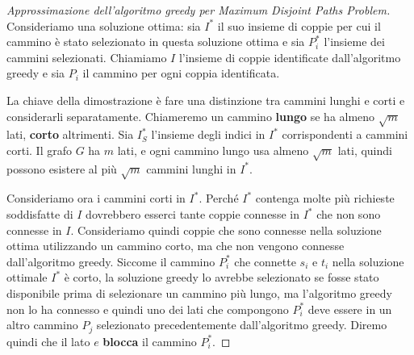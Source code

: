 \documentclass[\main/main.tex]{subfiles}
\begin{document}
\begin{proof}[Approssimazione dell'algoritmo greedy per Maximum Disjoint Paths Problem]
    Consideriamo una soluzione ottima: sia \(I^*\) il suo insieme di coppie per cui il cammino è stato selezionato in questa soluzione ottima e sia \(P_i^*\) l'insieme dei cammini selezionati. Chiamiamo \(I\) l'insieme di coppie identificate dall'algoritmo greedy e sia \(P_i\) il cammino per ogni coppia identificata.
    
    La chiave della dimostrazione è fare una distinzione tra cammini lunghi e corti e considerarli separatamente. Chiameremo un cammino \textbf{lungo} se ha almeno \(\sqrt{m}\) lati, \textbf{corto} altrimenti. Sia \(I_S^*\) l'insieme degli indici in \(I^*\) corrispondenti a cammini corti. Il grafo \(G\) ha \(m\) lati, e ogni cammino lungo usa almeno \(\sqrt{m}\) lati, quindi possono esistere al più \(\sqrt{m}\) cammini lunghi in \(I^*\).
    
    Consideriamo ora i cammini corti in \(I^*\). Perché \(I^*\) contenga molte più richieste soddisfatte di \(I\) dovrebbero esserci tante coppie connesse in \(I^*\) che non sono connesse in \(I\). Consideriamo quindi coppie che sono connesse nella soluzione ottima utilizzando un cammino corto, ma che non vengono connesse dall'algoritmo greedy. Siccome il cammino \(P^*_i\) che connette \(s_i\) e \(t_i\) nella soluzione ottimale \(I^*\) è corto, la soluzione greedy lo avrebbe selezionato se fosse stato disponibile prima di selezionare un cammino più lungo, ma l'algoritmo greedy non lo ha connesso e quindi uno dei lati che compongono \(P^*_i\) deve essere in un altro cammino \(P_j\) selezionato precedentemente dall'algoritmo greedy. Diremo quindi che il lato \(e\) \textbf{blocca} il cammino \(P_i^*\).
    

\end{proof}
\end{document}
